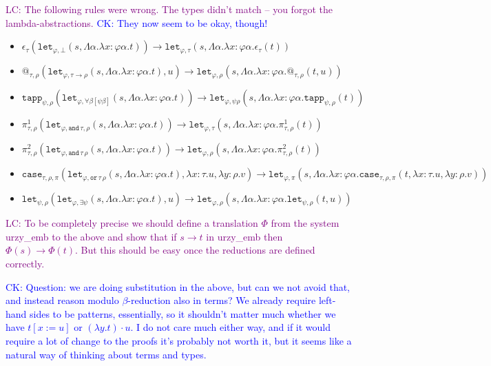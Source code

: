 \documentclass[runningheads,a4paper]{llncs}
\newcommand{\red}{\longrightarrow}
\newcommand{\arrtype}{\rightarrow}
\newcommand{\abs}[2]{\lambda #1.#2}
\newcommand{\tabs}[2]{\Lambda #1.#2}
\newcommand{\CK}[1]{\textcolor{blue}{CK: #1}}
\newcommand{\LC}[1]{\textcolor{purple}{LC: #1}}
\begin{document}
\LC{The following rules were wrong. The types didn't match -- you
  forgot the lambda-abstractions.}
\CK{They now seem to be okay, though!}
\begin{itemize}
\item
  $\epsilon_\tau(\mathtt{let}_{\varphi,\bot}(s,\tabs{\alpha}{\abs{x:\varphi\alpha}{t}}))
  \red
  \mathtt{let}_{\varphi,\tau}(s,\tabs{\alpha}{\abs{x:\varphi\alpha}{\epsilon_\tau(t)}})$
\item $@_{\tau,\rho}(\mathtt{let}_{\varphi, \tau \arrtype
  \rho}(s,\tabs{\alpha}{\abs{x:\varphi\alpha}{t}}),u) \red
  \mathtt{let}_{\varphi,\rho}(s,\tabs{\alpha}{\abs{x:\varphi\alpha}{@_{\tau,\rho}(t,
      u)}})$
\item
  $\mathtt{tapp}_{\psi,\rho}(\mathtt{let}_{\varphi,\forall\beta[\psi\beta]}(s,\tabs{\alpha}{\abs{x:\varphi\alpha}{t}}))
  \red
  \mathtt{let}_{\varphi,\psi\rho}(s,\tabs{\alpha}{\abs{x:\varphi\alpha}{\mathtt{tapp}_{\psi,\rho}(t)}})$
\item
  $\pi^1_{\tau,\rho}(\mathtt{let}_{\varphi,
  \mathtt{and}\,\tau,\rho}(s,\tabs{\alpha}{\abs{x:\varphi\alpha}{t}}))
  \red
  \mathtt{let}_{\varphi,\tau}(s,\tabs{\alpha}{\abs{x:\varphi\alpha}{\pi^1_{\tau,
        \rho}(t)}})$
\item
  $\pi^2_{\tau,\rho}(\mathtt{let}_{\varphi,
  \mathtt{and}\,\tau\,\rho}(s,\tabs{\alpha}{\abs{x:\varphi\alpha}{t}}))
  \red
  \mathtt{let}_{\varphi,\rho}(s,\tabs{\alpha}{\abs{x:\varphi\alpha}{\pi^2_{\tau,\rho}(t)}})$
\item $\mathtt{case}_{\tau,\rho,\pi}(
  \mathtt{let}_{\varphi,\mathtt{or}\,\tau\,\rho}(s,\tabs{\alpha}{\abs{x:\varphi\alpha}{t}}),\abs{x:\tau}{u},\abs{y:\rho}{v})
  \red
  \mathtt{let}_{\varphi,\pi}(s,\tabs{\alpha}{\abs{x:\varphi\alpha}{\mathtt{case}_{\tau,\rho,\pi}(t,\abs{x:\tau}{u},\abs{y:\rho}{v})}})$
\item
  $\mathtt{let}_{\psi,\rho}(\mathtt{let}_{\varphi,\exists\psi}(s,\tabs{\alpha}{\abs{x:\varphi\alpha}{t}}),u)
  \red
  \mathtt{let}_{\varphi,\rho}(s,\tabs{\alpha}{\abs{x:\varphi\alpha}{\mathtt{let}_{\psi,\rho}(t,u)}})$
\end{itemize}

\LC{To be completely precise we should define a translation $\Phi$
  from the system urzy\_emb to the above and show that if $s \red t$
  in urzy\_emb then $\Phi(s) \red \Phi(t)$. But this should be easy
  once the reductions are defined correctly.}

\CK{Question: we are doing substitution in the above, but can we not
  avoid  that, and instead reason modulo $\beta$-reduction also in
  terms?  We already require left-hand sides to be patterns,
  essentially, so it shouldn't matter much whether we have $t[x:=u]$
  or $(\abs{y}{t}) \cdot u$.  I do not care much either way, and if
  it would require a lot of change to the proofs it's probably not
  worth it, but it seems like a natural way of thinking about
  terms and types.}
\end{document}
